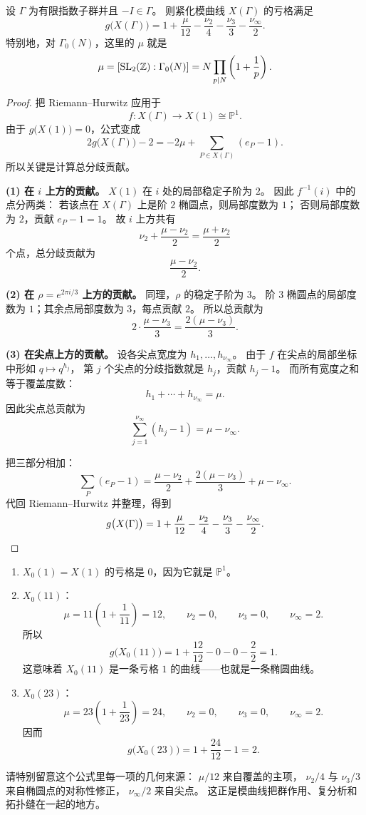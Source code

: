 \begin{theorem}
\label{thm:genus-formula-modular-curves}
设 $\Gamma$ 为有限指数子群并且 $-I\in\Gamma$。
则紧化模曲线 $X(\Gamma)$ 的亏格满足
\[
  g\bigl(X(\Gamma)\bigr)
  =1+\frac{\mu}{12}-\frac{\nu_2}{4}-\frac{\nu_3}{3}-\frac{\nu_\infty}{2}.
\]
特别地，对 $\Gamma_0(N)$，这里的 $\mu$ 就是
\[
  \mu=[\mathrm{SL}_2(\mathbb{Z}):\Gamma_0(N)]=N\prod_{p\mid N}\left(1+\frac1p\right).
\]
\end{theorem}

\begin{proof}
把 Riemann--Hurwitz 应用于
\[
  f\colon X(\Gamma)\longrightarrow X(1)\cong\mathbb{P}^1.
\]
由于 $g\bigl(X(1)\bigr)=0$，公式变成
\[
  2g\bigl(X(\Gamma)\bigr)-2=-2\mu+\sum_{P\in X(\Gamma)}(e_P-1).
\]
所以关键是计算总分歧贡献。

\textbf{(1) 在 $i$ 上方的贡献。}
$X(1)$ 在 $i$ 处的局部稳定子阶为 $2$。
因此 $f^{-1}(i)$ 中的点分两类：
若该点在 $X(\Gamma)$ 上是阶 $2$ 椭圆点，则局部度数为 $1$；
否则局部度数为 $2$，贡献 $e_P-1=1$。
故 $i$ 上方共有
\[
  \nu_2+\frac{\mu-\nu_2}{2}=\frac{\mu+\nu_2}{2}
\]
个点，总分歧贡献为
\[
  \frac{\mu-\nu_2}{2}.
\]

\textbf{(2) 在 $\rho=e^{2\pi i/3}$ 上方的贡献。}
同理，$\rho$ 的稳定子阶为 $3$。
阶 $3$ 椭圆点的局部度数为 $1$；其余点局部度数为 $3$，每点贡献 $2$。
所以总贡献为
\[
  2\cdot\frac{\mu-\nu_3}{3}=\frac{2(\mu-\nu_3)}{3}.
\]

\textbf{(3) 在尖点上方的贡献。}
设各尖点宽度为 $h_1,\dots,h_{\nu_\infty}$。
由于 $f$ 在尖点的局部坐标中形如 $q\mapsto q^{h_j}$，
第 $j$ 个尖点的分歧指数就是 $h_j$，贡献 $h_j-1$。
而所有宽度之和等于覆盖度数：
\[
  h_1+\cdots+h_{\nu_\infty}=\mu.
\]
因此尖点总贡献为
\[
  \sum_{j=1}^{\nu_\infty}(h_j-1)=\mu-\nu_\infty.
\]

把三部分相加：
\[
  \sum_P(e_P-1)=\frac{\mu-\nu_2}{2}+\frac{2(\mu-\nu_3)}{3}+\mu-\nu_\infty.
\]
代回 Riemann--Hurwitz 并整理，得到
\[
  g\bigl(X(\Gamma)\bigr)
  =1+\frac{\mu}{12}-\frac{\nu_2}{4}-\frac{\nu_3}{3}-\frac{\nu_\infty}{2}.
\qedhere
\]
\end{proof}

\begin{example}[三个最重要的例子]
\label{ex:genus-small-levels}
\begin{enumerate}
  \item $X_0(1)=X(1)$ 的亏格是 $0$，因为它就是 $\mathbb{P}^1$。
  \item $X_0(11)$：
    \[
      \mu=11\left(1+\frac1{11}\right)=12,
      \qquad \nu_2=0,
      \qquad \nu_3=0,
      \qquad \nu_\infty=2.
    \]
    所以
    \[
      g\bigl(X_0(11)\bigr)=1+\frac{12}{12}-0-0-\frac22=1.
    \]
    这意味着 $X_0(11)$ 是一条亏格 $1$ 的曲线——也就是一条椭圆曲线。
  \item $X_0(23)$：
    \[
      \mu=23\left(1+\frac1{23}\right)=24,
      \qquad \nu_2=0,
      \qquad \nu_3=0,
      \qquad \nu_\infty=2.
    \]
    因而
    \[
      g\bigl(X_0(23)\bigr)=1+\frac{24}{12}-1=2.
    \]
\end{enumerate}
\end{example}

\begin{remark}
请特别留意这个公式里每一项的几何来源：
$\mu/12$ 来自覆盖的主项，
$\nu_2/4$ 与 $\nu_3/3$ 来自椭圆点的对称性修正，
$\nu_\infty/2$ 来自尖点。
这正是模曲线把群作用、复分析和拓扑缝在一起的地方。
\end{remark}
